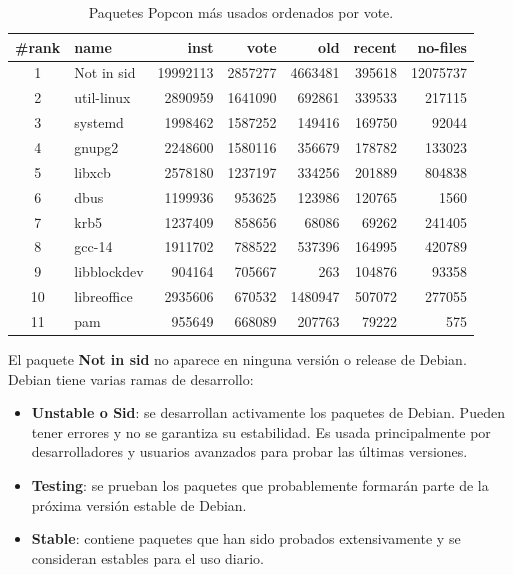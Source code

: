 \documentclass[a4paper, 12pt]{book}
\begin{document}
	\begin{table}[h!]
		\centering
		\begin{tabular}{|c|l|r|r|r|r|r|}
			\hline
			\#rank & name & inst & vote & old & recent & no-files \\
			\hline
			1 & Not in sid & 19992113 & 2857277 & 4663481 & 395618 & 12075737 \\
			\hline
			2 & util-linux & 2890959 & 1641090 & 692861 & 339533 & 217115 \\
			\hline
			3 & systemd & 1998462 & 1587252 & 149416 & 169750 & 92044 \\
			\hline
			4 & gnupg2 & 2248600 & 1580116 & 356679 & 178782 & 133023 \\
			\hline
			5 & libxcb & 2578180 & 1237197 & 334256 & 201889 & 804838 \\
			\hline
			6 & dbus & 1199936 & 953625 & 123986 & 120765 & 1560 \\
			\hline
			7 & krb5 & 1237409 & 858656 & 68086 & 69262 & 241405 \\
			\hline
			8 & gcc-14 & 1911702 & 788522 & 537396 & 164995 & 420789 \\
			\hline
			9 & libblockdev & 904164 & 705667 & 263 & 104876 & 93358 \\
			\hline
			10 & libreoffice & 2935606 & 670532 & 1480947 & 507072 & 277055 \\
			\hline
			11 & pam & 955649 & 668089 & 207763 & 79222 & 575 \\
			\hline
		\end{tabular}
		\caption{Paquetes Popcon más usados ordenados por vote.}
	\end{table}



El paquete \textbf{Not in sid} no aparece en ninguna versión o release de Debian.
Debian tiene varias ramas de desarrollo:
\begin{itemize}
	\item \textbf{Unstable o Sid}: se desarrollan activamente los paquetes de Debian. Pueden tener errores y no se garantiza su estabilidad. Es usada principalmente por desarrolladores y usuarios avanzados para probar las últimas versiones.
	\item \textbf{Testing}: se prueban los paquetes que probablemente formarán parte de la próxima versión estable de Debian.
	\item \textbf{Stable}: contiene paquetes que han sido probados extensivamente y se consideran estables para el uso diario.
	
\end{itemize}
\end{document}
